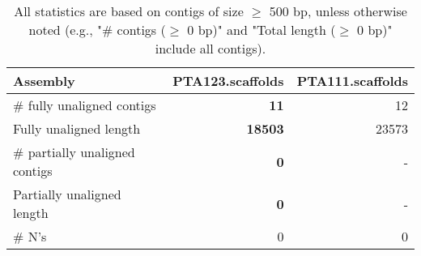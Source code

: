 \documentclass[12pt,a4paper]{article}
\begin{document}
\begin{table}[ht]
\begin{center}
\caption{All statistics are based on contigs of size $\geq$ 500 bp, unless otherwise noted (e.g., "\# contigs ($\geq$ 0 bp)" and "Total length ($\geq$ 0 bp)" include all contigs).}
\begin{tabular}{|l*{2}{|r}|}
\hline
Assembly & PTA123.scaffolds & PTA111.scaffolds \\ \hline
\# fully unaligned contigs & {\bf 11} & 12 \\ \hline
Fully unaligned length & {\bf 18503} & 23573 \\ \hline
\# partially unaligned contigs & {\bf 0} & - \\ \hline
Partially unaligned length & {\bf 0} & - \\ \hline
\# N's & 0 & 0 \\ \hline
\end{tabular}
\end{center}
\end{table}
\end{document}
